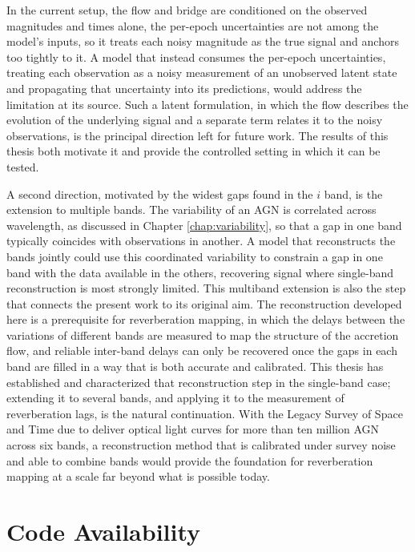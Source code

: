In the current setup, the flow and bridge are conditioned on the observed magnitudes and times alone, the per-epoch uncertainties are not among the model's inputs, so it treats each noisy magnitude as the true signal and anchors too tightly to it. A model that instead consumes the per-epoch uncertainties, treating each observation as a noisy measurement of an unobserved latent state and propagating that uncertainty into its predictions, would address the limitation at its source. Such a latent formulation, in which the flow describes the evolution of the underlying signal and a separate term relates it to the noisy observations, is the principal direction left for future work. The results of this thesis both motivate it and provide the controlled setting in which it can be tested.

A second direction, motivated by the widest gaps found in the $i$ band, is the extension to multiple bands. The variability of an AGN is correlated across wavelength, as discussed in Chapter \ref{chap:variability}, so that a gap in one band typically coincides with observations in another. A model that reconstructs the bands jointly could use this coordinated variability to constrain a gap in one band with the data available in the others, recovering signal where single-band reconstruction is most strongly limited. This multiband extension is also the step that connects the present work to its original aim. The reconstruction developed here is a prerequisite for reverberation mapping, in which the delays between the variations of different bands are measured to map the structure of the accretion flow, and reliable inter-band delays can only be recovered once the gaps in each band are filled in a way that is both accurate and calibrated. This thesis has established and characterized that reconstruction step in the single-band case; extending it to several bands, and applying it to the measurement of reverberation lags, is the natural continuation. With the Legacy Survey of Space and Time due to deliver optical light curves for more than ten million AGN across six bands, a reconstruction method that is calibrated under survey noise and able to combine bands would provide the foundation for reverberation mapping at a scale far beyond what is possible today.

\section*{Code Availability}
\label{sec:codeavailability}

